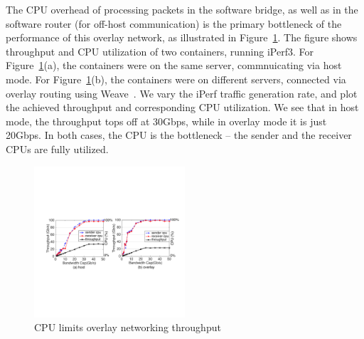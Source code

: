 The CPU overhead of processing packets in the software bridge, as well as in the
software router (for off-host communication) is the primary bottleneck of the
performance of this overlay network, as illustrated in
Figure~\ref{fig:mot_bw_cpu}. The figure shows throughput and CPU utilization of
two containers, running iPerf3. For Figure~\ref{fig:mot_bw_cpu}(a), the
containers were on the same server, commnuicating via host mode. For
Figure~\ref{fig:mot_bw_cpu}(b), the containers were on different servers,
connected via overlay routing using Weave~\cite{weave}. We vary the iPerf
traffic generation rate, and plot the achieved throughput and corresponding CPU
utilization. We see that in host mode, the throughput tops off at 30Gbps, while
in overlay mode it is just 20Gbps. In both cases, the CPU is the bottleneck --
the sender and the receiver CPUs are fully utilized.

\begin{figure}[t]
\centering 
\includegraphics[width=0.5\textwidth]{figures/motivation/mot_bw_cpu2.pdf} 
\caption{\label{fig:mot_bw_cpu}CPU limits overlay networking throughput}
\end{figure}
